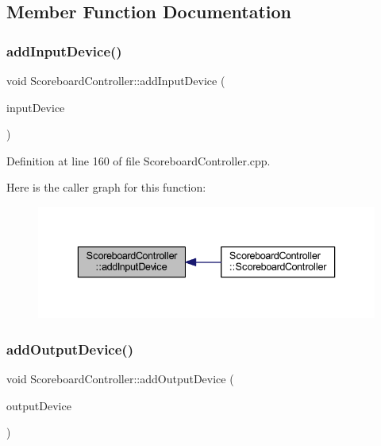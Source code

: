 \subsection{Member Function Documentation}
\mbox{\label{class_scoreboard_controller_aa42bf3e044b51f70fa6edc3a830809a0}} 
\subsubsection{\texorpdfstring{add\+Input\+Device()}{addInputDevice()}}
{\footnotesize\ttfamily void Scoreboard\+Controller\+::add\+Input\+Device (\begin{DoxyParamCaption}\item[{shared\+\_\+ptr$<$ \hyperlink{class_input_device}{Input\+Device} $>$}]{input\+Device }\end{DoxyParamCaption})}



Definition at line 160 of file Scoreboard\+Controller.\+cpp.

Here is the caller graph for this function\+:\nopagebreak
\begin{figure}[H]
\begin{center}
\leavevmode
\includegraphics[width=336pt]{class_scoreboard_controller_aa42bf3e044b51f70fa6edc3a830809a0_icgraph}
\end{center}
\end{figure}
\mbox{\label{class_scoreboard_controller_a7b2cc34a33c8203da586ffaab1fb3982}} 
\subsubsection{\texorpdfstring{add\+Output\+Device()}{addOutputDevice()}}
{\footnotesize\ttfamily void Scoreboard\+Controller\+::add\+Output\+Device (\begin{DoxyParamCaption}\item[{shared\+\_\+ptr$<$ \hyperlink{class_output_device}{Output\+Device} $>$}]{output\+Device }\end{DoxyParamCaption})}



